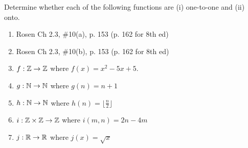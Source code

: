 \begin{questions}




 Determine whether each of the following functions are (i) one-to-one and (ii) onto. 
\begin{enumerate}[label=(\alph*),itemsep=0pt,parsep=0pt,topsep=0pt,partopsep=0pt]
    \item {} 
        Rosen Ch 2.3, \#10(a), p. 153 (p. 162 for 8th ed)
    \item {}
        Rosen Ch 2.3, \#10(b), p. 153 (p. 162 for 8th ed)
    \item {}
    	$f: \mathbb{Z} \rightarrow \mathbb{Z}$ where $f(x) = x^2 - 5x + 5$.
    \item {}
    	$g: \mathbb{N} \rightarrow \mathbb{N}$ where $g(n) = n+1$
    \item {}
    	$h: \mathbb{N} \rightarrow \mathbb{N}$ where $h(n) = \lfloor \frac{n}{2} \rfloor$
    \item {}
    	$i: \mathbb{Z} \times \mathbb{Z} \rightarrow \mathbb{Z}$ where $i(m,n) = 2n - 4m$
    \item {}
    	$j: \mathbb{R} \rightarrow \mathbb{R}$ where $j(x) = \sqrt{x}$
\end{enumerate}





\end{questions}
